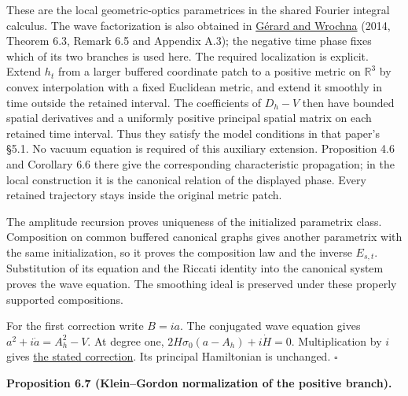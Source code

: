 \documentclass[
  english,
  11pt,
  reqno]{amsart}
\makeatletter
\newcommand{\pandocstatementheading}[1]{%
  \par\if@nobreak\else
    \addpenalty{\@beginparpenalty}%
    \addvspace{.5\baselineskip plus .2\baselineskip minus .2\baselineskip}%
  \fi
  {\normalfont\bfseries #1\par}%
  \nobreak\@afterindenttrue\@afterheading
}
\makeatother
\begin{document}
These are the local geometric-optics parametrices in the shared Fourier
integral calculus. The wave factorization is also obtained in
\hyperref[ref-gerard-wrochna2014]{Gérard and Wrochna} (2014, Theorem
6.3, Remark 6.5 and Appendix A.3); the negative time phase fixes which
of its two branches is used here. The required localization is explicit.
Extend \(h_t\) from a larger buffered coordinate patch to a positive
metric on \(\mathbb R^3\) by convex interpolation with a fixed Euclidean
metric, and extend it smoothly in time outside the retained interval.
The coefficients of \(D_h-V\) then have bounded spatial derivatives and
a uniformly positive principal spatial matrix on each retained time
interval. Thus they satisfy the model conditions in that paper's §5.1.
No vacuum equation is required of this auxiliary extension. Proposition
4.6 and Corollary 6.6 there give the corresponding characteristic
propagation; in the local construction it is the canonical relation of
the displayed phase. Every retained trajectory stays inside the original
metric patch.

The amplitude recursion proves uniqueness of the initialized parametrix
class. Composition on common buffered canonical graphs gives another
parametrix with the same initialization, so it proves the composition
law and the inverse \(E_{s,t}\). Substitution of its equation and the
Riccati identity into the canonical system proves the wave equation. The
smoothing ideal is preserved under these properly supported
compositions.

For the first correction write \(B=ia\). The conjugated wave equation
gives \(a^2+i\dot a=A_h^2-V\). At degree one,
\(2H\sigma_0(a-A_h)+i\dot H=0\). Multiplication by \(i\) gives
\hyperref[eq:online-wave-corrected-generator]{the stated correction}.
Its principal Hamiltonian is unchanged. \hfill\(\square\)

\pandocstatementheading{\leavevmode{}\label{prop:online-wave-charge-normalization}Proposition 6.7 (Klein--Gordon normalization of the positive branch).}
\end{document}
